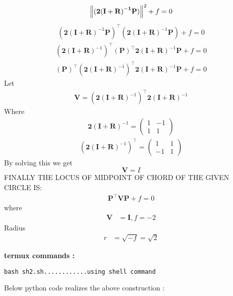 \documentclass[10pt, a4paper]{article}
\newcommand{\myvec}[1]{\ensuremath{\begin{pmatrix}#1\end{pmatrix}}}
\let\vec\mathbf
\begin{document}
\begin{align}
    \norm{\vec{(\vec{2(I+R)}^{-1}\vec{P})}}^2+f = 0
\end{align}
\begin{align}
(\vec{2(I+R)}^{-1}\vec{P})^{\top}(\vec{2(I+R)}^{-1}\vec{P})+f=0
\end{align}
\begin{align}
(\vec{2(I+R)}^{-1})^{\top}(\vec{P})^{\top}\vec{2(I+R)}^{-1}\vec{P}+f=0
\end{align}
\begin{align}
(\vec{P})^{\top}(\vec{2(I+R)}^{-1})^{\top}\vec{2(I+R)}^{-1}\vec{P}+f=0
\end{align}
Let
\begin{align}
\vec{V}=(\vec{2(I+R)}^{-1})^{\top}\vec{2(I+R)}^{-1}
\end{align}
Where
\begin{align}
\vec{2(I+R)}^{-1}=\myvec{1 & -1 \\1 & 1}
\end{align}
\begin{align}
(\vec{2(I+R)}^{-1})^{\top}=\myvec{1 & 1 \\-1 & 1}
\end{align}
By solving this we get
\begin{equation}
\vec{V}=I
\end{equation}
FINALLY THE LOCUS OF MIDPOINT OF CHORD OF THE GIVEN CIRCLE IS:
\begin{align}
\vec{P}^{\top}\vec{V}\vec{P}+f=0
\end{align}
where 
\begin{align}
	\vec{V} &= \vec{I}, f = -2
	\end{align}
Radius 
	\begin{align}
	r &=\sqrt{-f }=\sqrt{2}
    \end{align}

\textbf{termux commands :}
\begin{lstlisting}
bash sh2.sh............using shell command
\end{lstlisting}
\begin{center}
Below python code realizes the above construction :
\end{center}
\end{document}
